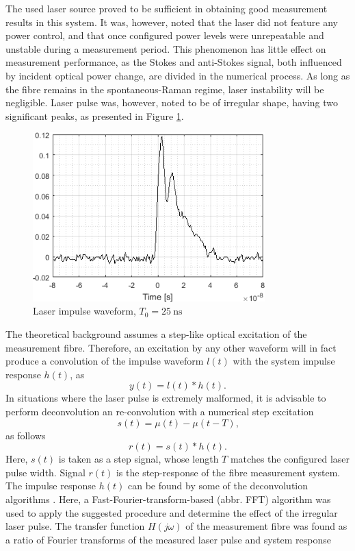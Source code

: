 \documentclass{standalone}
\begin{document}
The used laser source proved to be sufficient in obtaining good measurement results in this system. It was, however, noted that the laser did not feature any power control, and that once configured power levels were unrepeatable and unstable during a measurement period. This phenomenon has little effect on measurement performance, as the Stokes and anti-Stokes signal, both influenced by incident optical power change, are divided in the numerical process. As long as the fibre remains in the spontaneous-Raman regime, laser instability will be negligible. Laser pulse was, however, noted to be of irregular shape, having two significant peaks, as presented in Figure \ref{fig:laser_waveform}.
\begin{figure}[h]
	\centering
	\includegraphics[width=0.8\textwidth]{laser_waveform.png}
	\caption{Laser impulse waveform, $T_0 = \SI{25}{\nano \second}$}
	\label{fig:laser_waveform}
\end{figure}
The theoretical background assumes a step-like optical excitation of the measurement fibre. Therefore, an excitation by any other waveform will in fact produce a convolution of the impulse waveform $l(t)$ with the system impulse response $h(t)$, as
\begin{equation}
y(t) = l(t) \ast h(t) \textrm{.}
\end{equation}
In situations where the laser pulse is extremely malformed, it is advisable to perform deconvolution an re-convolution with a numerical step excitation
\begin{equation}
s(t) = \mu(t) - \mu(t-T) \textrm{,}
\end{equation}
as follows
\begin{equation}
r(t) = s(t) \ast h(t) \textrm{.}
\end{equation}
Here, $s(t)$ is taken as a step signal, whose length $T$ matches the configured laser pulse width. Signal $r(t)$ is the step-response of the fibre measurement system. The impulse response $h(t)$ can be found by some of the deconvolution algorithms \cite{fer:obrinf}. Here, a Fast-Fourier-transform-based (abbr. FFT) algorithm was used to apply the suggested procedure and determine the effect of the irregular laser pulse. The transfer function $H(j\omega)$ of the measurement fibre was found as a ratio of Fourier transforms of the measured laser pulse and system response
\end{document}

